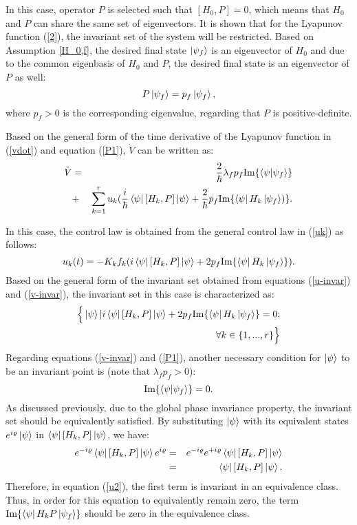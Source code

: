 \documentclass[journal]{IEEEtran}
\theoremstyle{definition}
\begin{document}
In this case, operator $P$ is selected such that $[H_0,P]=0$, which means that $H_0$ and $P$ can share the same set of eigenvectors. It is shown that for the Lyapunov function (\ref{2}), the invariant set of the system will be restricted.    
Based on Assumption \ref{H_0,f}, the desired final state $\ket{\psi_f}$ is an eigenvector of $H_0$ and due to the common eigenbasis of $H_0$ and $P$, the desired final state is an eigenvector of $P$ as well:
\begin{equation}\label{P1}
    P\ket{\psi_f}=p_f\ket{\psi_f},
\end{equation}
where $p_f > 0$ is the corresponding eigenvalue, regarding that $P$ is positive-definite.

Based on the general form of the time derivative of the Lyapunov function in (\ref{vdot}) and  equation (\ref{P1}), $\dot{V}$ can be written as:
\begin{eqnarray}\label{vdot1}
\dot{V}&=&\frac{2}{\hbar} \lambda_f{p_f}\text{Im}\{\braket{\psi|\psi_f}\} \\ &+& \displaystyle\sum_{k=1}^{r} {u_k(\frac{i}{\hbar}\bra{\psi}[H_k,P]\ket{\psi}+\frac{2}{\hbar} p_f\text{Im}\{\bra{\psi}H_k\ket{\psi_f}})\}. \nonumber
\end{eqnarray}

In this case, the control law is obtained from the general control law in (\ref{uk}) as follows:
\begin{equation}\label{uk1}
    u_k(t)=-K_k f_k(i\bra{\psi}[H_k,P]\ket{\psi}+2p_f\text{Im}\{\bra{\psi}H_k\ket{\psi_f}\}).
\end{equation}
Based on the general form of the invariant set obtained from equations (\ref{u-invar}) and (\ref{v-invar}), the invariant set in this case is characterized as:
\begin{eqnarray}\label{u2}
   \Big\{\ket{\psi} | i\bra{\psi}[H_k,P]\ket{\psi}+2p_f\text{Im}\{\bra{\psi}H_k\ket{\psi_f}\}=0; \\ \forall{k}\in \{1,...,r\}\Big\} \nonumber
\end{eqnarray}
Regarding equations (\ref{v-invar}) and (\ref{P1}), another necessary condition for $\ket{\psi}$ to be an invariant point is (note that $\lambda_f{p_f}>0$):
\begin{equation}
    \text{Im}\{\braket{\psi|\psi_f}\}=0.
\end{equation}
As discussed previously, due to the global phase invariance property, the invariant set should be equivalently satisfied. By substituting $\ket{\psi}$ with its equivalent states $e^{i\varrho}\ket{\psi}$ in $\bra{\psi}[H_k,P]\ket{\psi}$, we have:
\begin{eqnarray}
e^{-i\varrho}\bra{\psi}[H_k,P]\ket{\psi}e^{i\varrho} \nonumber &=& e^{-i\varrho}e^{+i\varrho}\bra{\psi}[H_k,P]\ket{\psi} \\ &=& \bra{\psi}[H_k,P]\ket{\psi}. 
\end{eqnarray}
Therefore, in equation (\ref{u2}), the first term is invariant in an equivalence class. Thus, in order for this equation to equivalently remain zero, the term $\text{Im}\{\bra{\psi}H_k P\ket{\psi_f}\}$ should be zero in the equivalence class.
\end{document}
